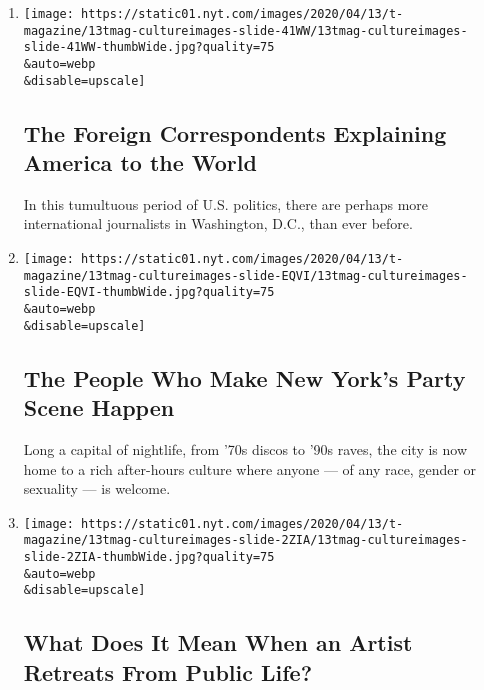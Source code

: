 \begin{enumerate}
\def\labelenumi{\arabic{enumi}.}
\item
  \href{/interactive/2020/04/13/t-magazine/foreign-correspondents.html}{}

  \texttt{[image: https://static01.nyt.com/images/2020/04/13/t-magazine/13tmag-cultureimages-slide-41WW/13tmag-cultureimages-slide-41WW-thumbWide.jpg?quality=75\\\&auto=webp\\\&disable=upscale]}

  \hypertarget{the-foreign-correspondents-explaining-america-to-the-world}{%
  \subsection{The Foreign Correspondents Explaining America to the
  World}\label{the-foreign-correspondents-explaining-america-to-the-world}}

  In this tumultuous period of U.S. politics, there are perhaps more
  international journalists in Washington, D.C., than ever before.
\item
  \href{/interactive/2020/04/13/t-magazine/nyc-downtown-nightlife-party-scene.html}{}

  \texttt{[image: https://static01.nyt.com/images/2020/04/13/t-magazine/13tmag-cultureimages-slide-EQVI/13tmag-cultureimages-slide-EQVI-thumbWide.jpg?quality=75\\\&auto=webp\\\&disable=upscale]}

  \hypertarget{the-people-who-make-new-yorks-party-scene-happen}{%
  \subsection{The People Who Make New York's Party Scene
  Happen}\label{the-people-who-make-new-yorks-party-scene-happen}}

  Long a capital of nightlife, from '70s discos to '90s raves, the city
  is now home to a rich after-hours culture where anyone --- of any
  race, gender or sexuality --- is welcome.
\item
  \href{/interactive/2020/04/13/t-magazine/artist-recluse.html}{}

  \texttt{[image: https://static01.nyt.com/images/2020/04/13/t-magazine/13tmag-cultureimages-slide-2ZIA/13tmag-cultureimages-slide-2ZIA-thumbWide.jpg?quality=75\\\&auto=webp\\\&disable=upscale]}

  \hypertarget{what-does-it-mean-when-an-artist-retreats-from-public-life}{%
  \subsection{What Does It Mean When an Artist Retreats From Public
  Life?}\label{what-does-it-mean-when-an-artist-retreats-from-public-life}}


\end{enumerate}
